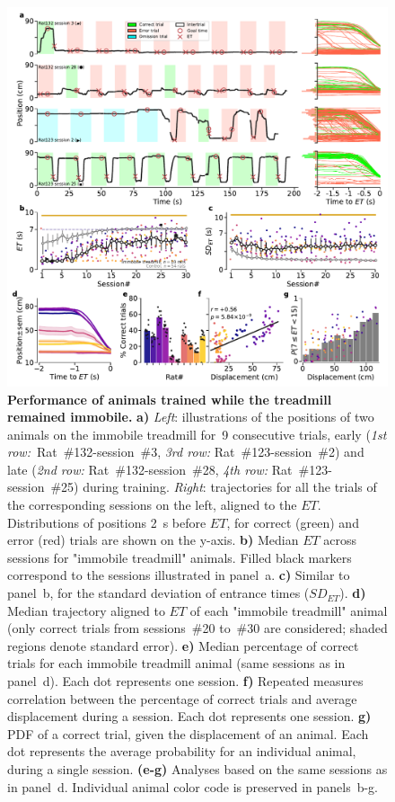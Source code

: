 \begin{figure}[bt!]
  \begin{center}
    \includegraphics[width=.8\linewidth]{ch-time/figures/ImmTrd.pdf}
    \caption[Immobile treadmill]
    {\textbf{Performance of animals trained while the treadmill remained immobile.}
    \textbf{a)}
    \textit{Left}: illustrations of the positions of two animals on the immobile treadmill for~9 consecutive trials, early (\textit{1st row:}~Rat~\#132-session~\#3, \textit{3rd row:} Rat~\#123-session~\#2) and late (\textit{2nd row:} Rat~\#132-session~\#28, \textit{4th row:} Rat~\#123-session~\#25) during training.
    \textit{Right}: trajectories for all the trials of the corresponding sessions on the left, aligned to the $ET$.
    Distributions of positions 2~s before $ET$, for correct (green) and error (red) trials are shown on the y-axis.
    \textbf{b)}
    Median $ET$ across sessions for "immobile treadmill" animals.
    Filled black markers correspond to the sessions illustrated in panel~a.
    \textbf{c)}
    Similar to panel~b, for the standard deviation of entrance times ($SD_{ET}$).
    \textbf{d)}
    Median trajectory aligned to $ET$ of each "immobile treadmill" animal (only correct trials from sessions~\#20 to~\#30 are considered; shaded regions denote standard error).
    \textbf{e)}
    Median percentage of correct trials for each immobile treadmill animal (same sessions as in panel~d).
    Each dot represents one session.
    \textbf{f)}
    Repeated measures correlation between the percentage of correct trials and average displacement during a session.
    Each dot represents one session.
    \textbf{g)}
    PDF of a correct trial, given the displacement of an animal.
    Each dot represents the average probability for an individual animal, during a single session.
    \textbf{(e-g)}
    Analyses based on the same sessions as in panel~d.
    Individual animal color code is preserved in panels~b-g.
    }
    \label{fig:time:ImmTrd}
  \end{center}
\end{figure}
